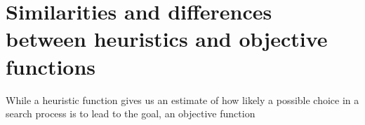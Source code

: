 \section*{Similarities and differences between heuristics and objective functions}

While a heuristic function gives us an estimate of how likely a possible choice in a search process is to lead to the goal, an objective function 
